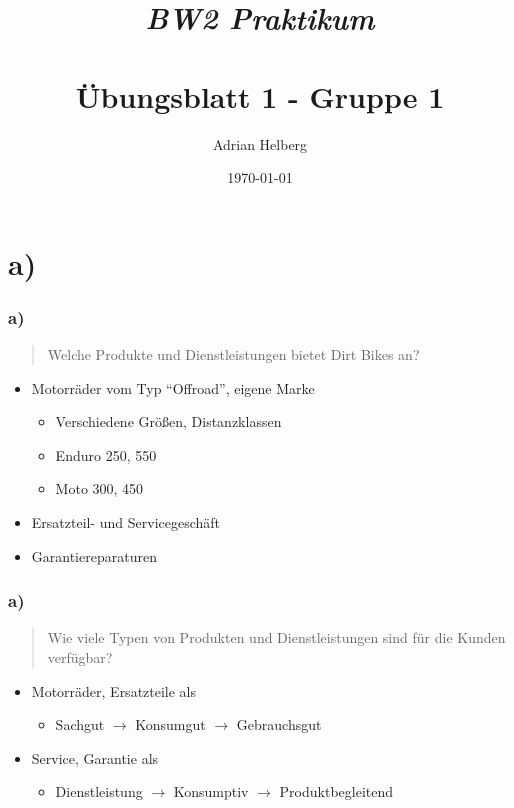 \documentclass{beamer}
\title{
	\textit{BW2 Praktikum} \\
	\textbf{\\ \"Ubungsblatt 1 - Gruppe 1}
}
\author{Adrian Helberg}
\date{\today}
\begin{document}

\maketitle

\section{a)}
\begin{frame}
\frametitle{a)}

\begin{quote}
Welche Produkte und Dienstleistungen bietet Dirt Bikes an? 
\end{quote}

\begin{itemize}
\setlength{\itemsep}{20pt}
\item Motorr\"ader vom Typ ``Offroad'', eigene Marke
\begin{itemize}
\item Verschiedene Gr\"oßen, Distanzklassen
\item Enduro 250, 550
\item Moto 300, 450
\end{itemize}
\item Ersatzteil- und Servicegesch\"aft
\item Garantiereparaturen
\end{itemize}

\end{frame}

\begin{frame}
\frametitle{a)}

\begin{quote}
Wie viele Typen von Produkten und Dienstleistungen sind für die Kunden verfügbar?
\end{quote}

\begin{itemize}
\setlength{\itemsep}{12pt}
\item Motorräder, Ersatzteile als
\begin{itemize}
\item Sachgut $\rightarrow$ Konsumgut $\rightarrow$ Gebrauchsgut
\end{itemize}
\item Service, Garantie als
\begin{itemize}
\item Dienstleistung $\rightarrow$ Konsumptiv $\rightarrow$ Produktbegleitend
\end{itemize}
\end{itemize}

\end{frame}
\end{document}
